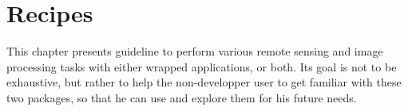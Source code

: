\chapter{Recipes}\label{chap:recipes}

This chapter presents guideline to perform various remote sensing and
image processing tasks with either wrapped applications, \mont or both. Its goal is
not to be exhaustive, but rather to help the non-developper user to
get familiar with these two packages, so that he can use and explore
them for his future needs.





